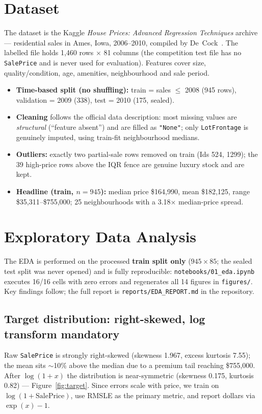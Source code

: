 \documentclass[11pt,a4paper]{article}
\begin{document}
\section{Dataset}
The dataset is the Kaggle \emph{House Prices: Advanced Regression Techniques}
archive --- residential sales in Ames, Iowa, 2006--2010, compiled by
De~Cock~\cite{decock2011}. The labelled file holds 1{,}460 rows $\times$ 81
columns (the competition test file has no \texttt{SalePrice} and is never used
for evaluation). Features cover size, quality/condition, age, amenities,
neighbourhood and sale period.

\begin{itemize}
  \item \textbf{Time-based split (no shuffling):} train = sales $\le$ 2008
        (945 rows), validation = 2009 (338), test = 2010 (175, sealed).
  \item \textbf{Cleaning} follows the official data description: most missing
        values are \emph{structural} (``feature absent'') and are filled as
        \texttt{"None"}; only \texttt{LotFrontage} is genuinely imputed, using
        train-fit neighbourhood medians.
  \item \textbf{Outliers:} exactly two partial-sale rows removed on train
        (Ids 524, 1299); the 39 high-price rows above the IQR fence are genuine
        luxury stock and are kept.
  \item \textbf{Headline (train, $n=945$):} median price \$164{,}990, mean
        \$182{,}125, range \$35{,}311--\$755{,}000; 25 neighbourhoods with a
        3.18$\times$ median-price spread.
\end{itemize}

\section{Exploratory Data Analysis}
The EDA is performed on the processed \textbf{train split only}
($945 \times 85$; the sealed test split was never opened) and is fully
reproducible: \texttt{notebooks/01\_eda.ipynb} executes 16/16 cells with zero
errors and regenerates all 14 figures in \texttt{figures/}. Key findings
follow; the full report is \texttt{reports/EDA\_REPORT.md} in the repository.

\subsection{Target distribution: right-skewed, log transform mandatory}
Raw \texttt{SalePrice} is strongly right-skewed (skewness 1.967, excess
kurtosis 7.55); the mean sits $\sim$10\% above the median due to a premium tail
reaching \$755{,}000. After $\log(1+x)$ the distribution is near-symmetric
(skewness 0.175, kurtosis 0.82) --- Figure~\ref{fig:target}. Since errors
scale with price, we train on $\log(1+\text{SalePrice})$, use RMSLE as the
primary metric, and report dollars via $\exp(x)-1$.
\end{document}
